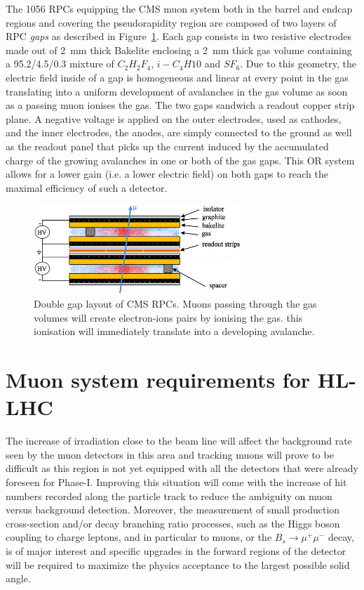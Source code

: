 	The 1056 RPCs equipping the CMS muon system both in the barrel and endcap regions and covering the pseudorapidity region  are composed of two layers of RPC \textit{gaps} as described in Figure~\ref{fig:RPC-DG-layout}. Each gap consists in two resistive electrodes made out of \SI{2}{mm} thick Bakelite enclosing a \SI{2}{mm} thick gas volume containing a 95.2/4.5/0.3 mixture of $C_2H_2F_4$, $i-C_4H10$ and $SF_6$. Due to this geometry, the electric field inside of a gap is homogeneous and linear at every point in the gas translating into a uniform development of avalanches in the gas volume as soon as a passing muon ionises the gas. The two gaps sandwich a readout copper strip plane. A negative voltage is applied on the outer electrodes, used as cathodes, and the inner electrodes, the anodes, are simply connected to the ground as well as the readout panel that picks up the current induced by the accumulated charge of the growing avalanches in one or both of the gas gaps. This OR system allows for a lower gain (i.e. a lower electric field) on both gaps to reach the maximal efficiency of such a detector.
	
	\begin{figure}[H]
		\centering
		\includegraphics[width=0.7\textwidth]{fig/chapt2/RPC_DG_layout.png}
		\caption{\label{fig:RPC-DG-layout} Double gap layout of CMS RPCs. Muons passing through the gas volumes will create electron-ions pairs by ionising the gas. this ionisation will immediately translate into a developing avalanche.}
	\end{figure}
	
\section{Muon system requirements for HL-LHC}
\label{chapt3:sec:requirements}

	The increase of irradiation close to the beam line will affect the background rate seen by the muon detectors in this area and tracking muons will prove to be difficult as this region is not yet equipped with all the detectors that were already foreseen for Phase-I. Improving this situation will come with the increase of hit numbers recorded along the particle track to reduce the ambiguity on muon versus background detection. Moreover, the measurement of small production cross-section and/or decay branching ratio processes, such as the Higgs boson coupling to charge leptons, and in particular to muons, or the $B_s \longrightarrow \mu^+\mu^-$ decay, is of major interest and specific upgrades in the forward regions of the detector will be required to maximize the physics acceptance to the largest possible solid angle.

